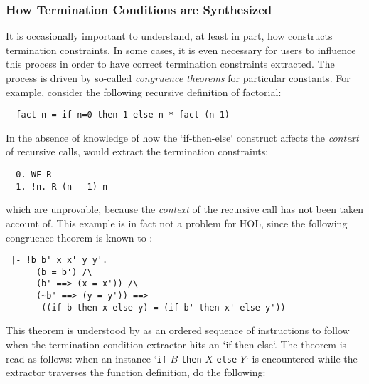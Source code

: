 \subsubsection{How Termination Conditions are Synthesized}

It is occasionally important to understand, at least in part, how
 constructs termination constraints. In some cases, it is
even necessary for users to influence this process in order to have correct
termination constraints extracted. The process is driven by so-called
\emph{congruence theorems} for particular \HOL{} constants.
For example, consider the following recursive definition of factorial:
%
\begin{hol}
\begin{verbatim}
  fact n = if n=0 then 1 else n * fact (n-1)
\end{verbatim}
\end{hol}
%
In the absence of knowledge of how the `if-then-else` construct
affects the \emph{context} of recursive calls,  would
extract the termination constraints:
%
\begin{hol}
\begin{verbatim}
  0. WF R
  1. !n. R (n - 1) n
\end{verbatim}
\end{hol}
%
which are unprovable, because the \emph{context} of the recursive call has not
been taken account of. This example is in fact not a problem for HOL,
since the following congruence theorem is known to :
%
\begin{hol}
\begin{verbatim}
 |- !b b' x x' y y'.
      (b = b') /\
      (b' ==> (x = x')) /\
      (~b' ==> (y = y')) ==>
       ((if b then x else y) = (if b' then x' else y'))
\end{verbatim}
\end{hol}
%
This theorem is understood by  as an ordered sequence
of instructions to follow when the termination condition extractor
hits an `if-then-else`. The theorem is read as follows: when an
instance `\texttt{if} $B$ \texttt{then} $X$ \texttt{else} $Y$` is
encountered while the extractor traverses the function definition,
do the following:
